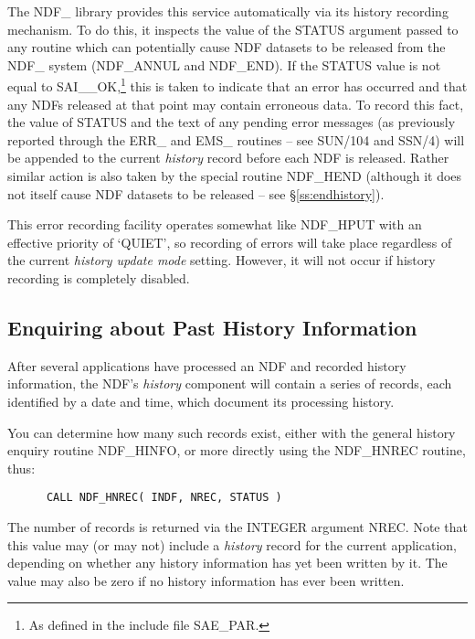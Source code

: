 \documentclass[twoside,11pt]{article}
\newcommand{\htmlref}[2]{#1}
\newcommand{\xref}[3]{#1}
\newcommand{\xlabel}[1]{}
\newcommand{\st}[1]{{\em{#1}}}
\begin{document}
The NDF\_ library provides this service automatically via its history
recording mechanism. To do this, it inspects the value of the STATUS
argument passed to any routine which can potentially cause NDF
datasets to be released from the NDF\_ system (\htmlref{NDF\_ANNUL}{NDF_ANNUL} and
\htmlref{NDF\_END}{NDF_END}).  If the STATUS value is not equal to SAI\_\_OK,\footnote{As
defined in the include file SAE\_PAR.} this is taken to indicate that
an error has occurred and that any NDFs released at that point may
contain erroneous data. To record this fact, the value of STATUS and
the text of any pending error messages (as previously reported through
the ERR\_ and EMS\_ routines -- see \xref{SUN/104}{sun104}{err} and
\xref{SSN/4}{ssn4}{}) will be appended to the current \st{history\/}
record before
each NDF is released.  Rather similar action is also taken by the
special routine \htmlref{NDF\_HEND}{NDF_HEND} (although it does not itself cause NDF
datasets to be released -- see \S\ref{ss:endhistory}).

This error recording facility operates somewhat like \htmlref{NDF\_HPUT}{NDF_HPUT} with an
effective priority of `QUIET', so recording of errors will take place
regardless of the current \st{history update mode\/} setting.  However,
it will not occur if history recording is completely disabled.

\subsection{\xlabel{enquiring_about_past_history_information}Enquiring about Past History Information}

After several applications have processed an NDF and recorded history
information, the NDF's \st{history\/} component will contain a series of
records, each identified by a date and time, which document its
processing history.

You can determine how many such records exist, either with the general
history enquiry routine \htmlref{NDF\_HINFO}{NDF_HINFO}, or more directly using the
\htmlref{NDF\_HNREC}{NDF_HNREC} routine, thus:

\small
\begin{verbatim}
      CALL NDF_HNREC( INDF, NREC, STATUS )
\end{verbatim}
\normalsize

The number of records is returned via the INTEGER argument NREC. Note
that this value may (or may not) include a \st{history\/} record for
the current application, depending on whether any history information
has yet been written by it. The value may also be zero if no history
information has ever been written.
\end{document}
